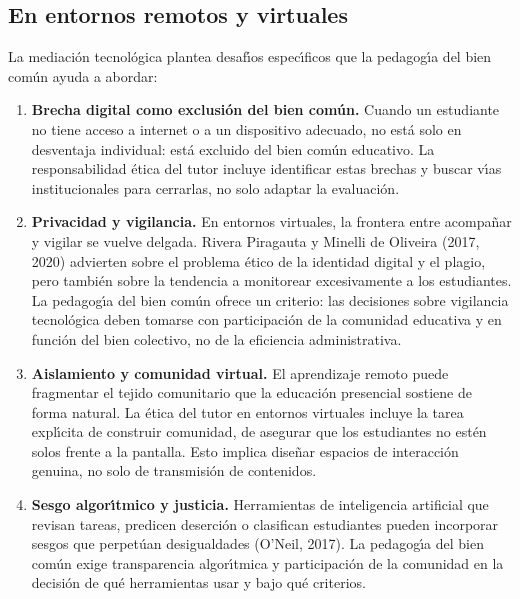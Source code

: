 \documentclass[12pt,letterpaper]{article}
\begin{document}
\subsection{En entornos remotos y virtuales}

La mediaci\'on tecnol\'ogica plantea desaf\'{\i}os espec\'{\i}ficos que la pedagog\'{\i}a del bien com\'un ayuda a abordar:

\begin{enumerate}
  \item \textbf{Brecha digital como exclusi\'on del bien com\'un.} Cuando un estudiante no tiene acceso a internet o a un dispositivo adecuado, no est\'a solo en desventaja individual: est\'a excluido del bien com\'un educativo. La responsabilidad \'etica del tutor incluye identificar estas brechas y buscar v\'{\i}as institucionales para cerrarlas, no solo adaptar la evaluaci\'on.

  \item \textbf{Privacidad y vigilancia.} En entornos virtuales, la frontera entre acompa\~nar y vigilar se vuelve delgada. Rivera Piragauta y Minelli de Oliveira (2017, 2020) advierten sobre el problema \'etico de la identidad digital y el plagio, pero tambi\'en sobre la tendencia a monitorear excesivamente a los estudiantes. La pedagog\'{\i}a del bien com\'un ofrece un criterio: las decisiones sobre vigilancia tecnol\'ogica deben tomarse con participaci\'on de la comunidad educativa y en funci\'on del bien colectivo, no de la eficiencia administrativa.

  \item \textbf{Aislamiento y comunidad virtual.} El aprendizaje remoto puede fragmentar el tejido comunitario que la educaci\'on presencial sostiene de forma natural. La \'etica del tutor en entornos virtuales incluye la tarea expl\'{\i}cita de construir comunidad, de asegurar que los estudiantes no est\'en solos frente a la pantalla. Esto implica dise\~nar espacios de interacci\'on genuina, no solo de transmisi\'on de contenidos.

  \item \textbf{Sesgo algor\'{\i}tmico y justicia.} Herramientas de inteligencia artificial que revisan tareas, predicen deserci\'on o clasifican estudiantes pueden incorporar sesgos que perpet\'uan desigualdades (O'Neil, 2017). La pedagog\'{\i}a del bien com\'un exige transparencia algor\'{\i}tmica y participaci\'on de la comunidad en la decisi\'on de qu\'e herramientas usar y bajo qu\'e criterios.
\end{enumerate}
\end{document}
